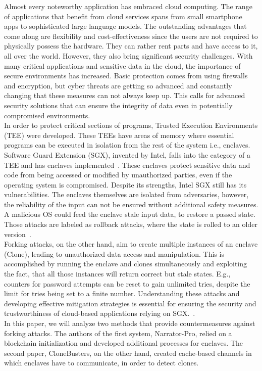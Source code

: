
Almost every noteworthy application has embraced cloud computing. The range of applications that benefit from cloud services spans from small smartphone apps to sophisticated large language models. The outstanding advantages that come along are flexibility and cost-effectiveness since the users are not required to physically possess the hardware. They can rather rent parts and have access to it, all over the world. However, they also bring significant security challenges. With many critical applications and sensitive data in the cloud, the importance of secure environments has increased. Basic protection comes from using firewalls and encryption, but cyber threats are getting so advanced and constantly changing that these measures can not always keep up. This calls for advanced security solutions that can ensure the integrity of data even in potentially compromised environments.\\
In order to protect critical sections of programs, Trusted Execution Environments (TEE) were developed. These TEEs have areas of memory where essential programs can be executed in isolation from the rest of the system i.e., enclaves. Software Guard Extension (SGX), invented by Intel, falls into the category of a TEE and has enclaves implemented~\cite{SGX}. These enclaves protect sensitive data and code from being accessed or modified by unauthorized parties, even if the operating system is compromised. Despite its strengths, Intel SGX still has its vulnerabilities. The enclaves themselves are isolated from adversaries, however, the reliability of the input can not be ensured without additional safety measures. A malicious OS could feed the enclave stale input data, to restore a passed state. Those attacks are labeled as rollback attacks, where the state is rolled to an older version~\cite{esccc}. \\
Forking attacks, on the other hand, aim to create multiple instances of an enclave (Clone), leading to unauthorized data access and manipulation. This is accomplished by running the enclave and clones simultaneously and exploiting the fact, that all those instances will return correct but stale states. E.g., counters for password attempts can be reset to gain unlimited tries, despite the limit for tries being set to a finite number. Understanding these attacks and developing effective mitigation strategies is essential for ensuring the security and trustworthiness of cloud-based applications relying on SGX.~\cite{nfw}.\\
In this paper, we will analyze two methods that provide countermeasures against forking attacks. The authors of the first system, Narrator-Pro, relied on a blockchain initialization and developed additional processes for enclaves. The second paper, CloneBusters, on the other hand, created cache-based channels in which enclaves have to communicate, in order to detect clones.
